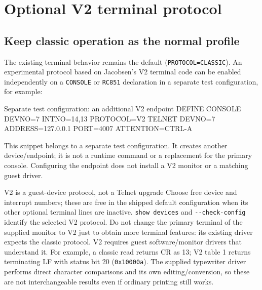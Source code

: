\chapter{Optional V2 terminal protocol}\label{optional-v2-terminal-protocol}

\section{Keep classic operation as the normal profile}\label{keep-classic-operation-as-the-normal-profile}

The existing terminal behavior remains the default (\passthrough{\lstinline!PROTOCOL=CLASSIC!}). An experimental protocol based on Jacobsen's V2 terminal code can be enabled independently on a \passthrough{\lstinline!CONSOLE!} or \passthrough{\lstinline!RC851!} declaration in a separate test configuration, for example:

\begin{commandexample}{Separate test configuration: an additional V2 endpoint}
DEFINE CONSOLE DEVNO=7 INTNO=14,13 PROTOCOL=V2
TELNET DEVNO=7 ADDRESS=127.0.0.1 PORT=4007 ATTENTION=CTRL-A
\end{commandexample}

This snippet belongs to a separate test configuration. It creates another device/endpoint; it is not a runtime command or a replacement for the primary console. Configuring the endpoint does not install a V2 monitor or a matching guest driver.

\begin{operationnote}{V2 is a guest-device protocol, not a Telnet upgrade}
Choose free device and interrupt numbers; these are free in the shipped default configuration when its other optional terminal lines are inactive. \passthrough{\lstinline!show devices!} and \passthrough{\lstinline!--check-config!} identify the selected V2 protocol. Do not change the primary terminal of the supplied monitor to V2 just to obtain more terminal features: its existing driver expects the classic protocol. V2 requires guest software/monitor drivers that understand it. For example, a classic read returns CR as 13; V2 table 1 returns terminating LF with status bit 20 (\passthrough{\lstinline!0x10000a!}). The supplied typewriter driver performs direct character comparisons and its own editing/conversion, so these are not interchangeable results even if ordinary printing still works.
\end{operationnote}

